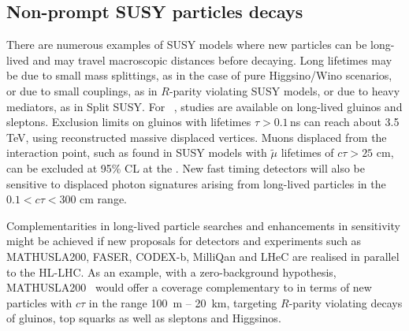 \documentclass[../report.tex]{subfiles}
\begin{document}
\subsection{Non-prompt SUSY particles decays}
There are numerous examples of SUSY models where new particles can be long-lived and may travel macroscopic distances before decaying. Long lifetimes may be due to small mass splittings, as in the case of pure Higgsino/Wino scenarios, or due to small couplings, as in $R$-parity violating SUSY models, or due to heavy mediators, as in Split SUSY.
For \HLLHC~\cite{CidVidal:2018eel}, studies are available on long-lived gluinos and sleptons. Exclusion limits on gluinos with lifetimes $\tau>0.1$\,ns can reach about 3.5 TeV, using reconstructed massive displaced vertices. Muons displaced from the interaction point, such as found in SUSY models with $\tilde{\mu}$ lifetimes of $c\tau > 25$ cm, can be excluded at 95\% CL at the \HLLHC. New fast timing detectors will also be sensitive to displaced photon signatures arising from long-lived particles in the $0.1 < c\tau < 300$ cm range.

Complementarities in long-lived particle searches and enhancements in sensitivity might be achieved if new proposals for detectors and experiments such as MATHUSLA200, FASER, CODEX-b, MilliQan and LHeC are realised in parallel to the HL-LHC. As an example, with a zero-background hypothesis, MATHUSLA200~\cite{Curtin:2018mvb} would offer a coverage complementary to \HLLHC in terms of new particles with $c\tau$ in the range 100~m -- 20~km, targeting $R$-parity violating decays of gluinos, top squarks as well as sleptons and Higgsinos.
\end{document}
